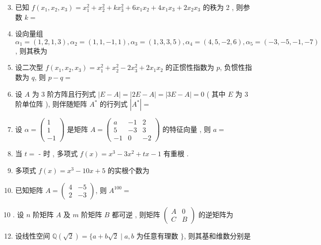 \documentclass[10pt]{article}
\begin{document}
{\begin{enumerate}
  \setcounter{enumi}{2}
  \item  已知  $f\left(x_{1}, x_{2}, x_{3}\right)=x_{1}^{2}+x_{2}^{2}+k x_{3}^{2}+6 x_{1} x_{2}+4 x_{1} x_{3}+2 x_{2} x_{3}$  的秩为  2 ,  则参数  $k=$

  \item  设向量组  $\alpha_{1}=(1,2,1,3), \alpha_{2}=(1,1,-1,1), \alpha_{3}=(1,3,3,5), \alpha_{4}=(4,5,-2,6), \alpha_{5}=(-3,-5,-1,-7)$,  则其秩为 

  \item  设二次型  $f\left(x_{1}, x_{2}, x_{3}\right)=x_{1}^{2}+x_{2}^{2}-2 x_{3}^{2}+2 x_{1} x_{2}$  的正惯性指数为  $p$,  负惯性指数为  $q$,  则  $p-q=$

  \item  设  $A$  为  3  阶方阵且行列式  $|E-A|=|2 E-A|=|3 E-A|=0$ ( 其中  $E$  为  3  阶单位阵 ),  则伴随矩阵  $A^{*}$  的行列式  $\left|A^{*}\right|=$

  \item  设  $\alpha=\left(\begin{array}{c}1 \\ 1 \\ -1\end{array}\right)$  是矩阵  $A=\left(\begin{array}{ccc}a & -1 & 2 \\ 5 & -3 & 3 \\ -1 & 0 & -2\end{array}\right)$  的特征向量 ,  则  $a=$

  \item  当  $t=$ -  时 ,  多项式  $f(x)=x^{3}-3 x^{2}+t x-1$  有重根 .

  \item  多项式  $f(x)=x^{3}-10 x+5$  的实根个数为 

  \item  已知矩阵  $A=\left(\begin{array}{rr}4 & -5 \\ 2 & -3\end{array}\right)$,  则  $A^{100}=$

\end{enumerate}
10 .  设  $n$  阶矩阵  $A$  及  $m$  阶矩阵  $B$  都可逆 ,  则矩阵  $\left(\begin{array}{cc}A & 0 \\ C & B\end{array}\right)$  的逆矩阵为 

\begin{enumerate}
  \setcounter{enumi}{11}
  \item  设线性空间  $\mathbb{Q}(\sqrt{2})=\{a+b \sqrt{2} \mid a, b$  为任意有理数  $\}$,  则其基和维数分别是 


\end{enumerate}}
\end{document}
